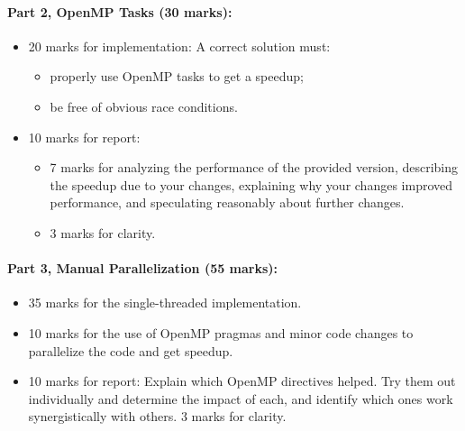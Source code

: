 \documentclass[letterpaper,10pt]{article}
\begin{document}
\paragraph{Part 2, OpenMP Tasks (30 marks):} 

\begin{itemize}
\item 20 marks for implementation: A correct solution must:
\begin{itemize}
	\item properly use OpenMP tasks to get a speedup;
	\item be free of obvious race conditions.
\end{itemize}
\item 10 marks for report: 
\begin{itemize}
\item 7 marks for analyzing the performance
of the provided version, describing the speedup due to your
changes, explaining why your changes improved performance, and
speculating reasonably about further changes. 
\item 3 marks for clarity.
\end{itemize}
\end{itemize}

\paragraph{Part 3, Manual Parallelization (55 marks):} 
\begin{itemize}
\item 35 marks for the single-threaded implementation. 

\item 10 marks for the use of OpenMP pragmas and minor code changes to parallelize the code and get speedup.

\item 10 marks for report: Explain which OpenMP directives helped. Try them out individually and determine the impact of each, and identify which ones work synergistically with others. 3 marks for clarity.
\end{itemize}
\end{document}

